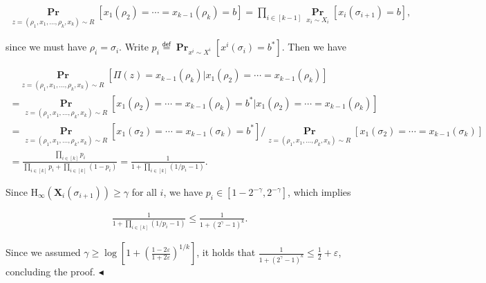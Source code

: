 \documentclass[10pt,a4paper]{article}
\begin{document}
\[\begin{gathered}
\operatorname*{\mathbf{Pr}}_{z=(\rho_{1},x_{1},\dots,\rho_{k},x_{k})\sim R}\left[x_{1}(\rho_{2})=\cdots=x_{k-1}(\rho_{k})=b\right]=\prod_{i\in[k-1]}\operatorname*{\mathbf{Pr}}_{x_{i}\sim X_{i}}\left[x_{i}(\sigma_{i+1})=b\right],
\end{gathered}\]


since we must have $\rho_{i}=\sigma_{i}$.
Write $p_{i}\stackrel{{\scriptstyle\mathsf{def}}}{{=}}\operatorname*{\mathbf{Pr}}_{x^{i}\sim X^{i}}\left[x^{i}(\sigma_{i})=b^{*}\right]$.
Then we have\par




\[\begin{gathered}
\displaystyle\quad\operatorname*{\mathbf{Pr}}_{z=(\rho_{1},x_{1},\dots,\rho_{k},x_{k})\sim R}\left[\Pi(z)=x_{k-1}(\rho_{k})|x_{1}(\rho_{2})=\cdots=x_{k-1}(\rho_{k})\right] \\
\displaystyle=\operatorname*{\mathbf{Pr}}_{z=(\rho_{1},x_{1},\dots,\rho_{k},x_{k})\sim R}\left[x_{1}(\rho_{2})=\cdots=x_{k-1}(\rho_{k})=b^{*}|x_{1}(\rho_{2})=\cdots=x_{k-1}(\rho_{k})\right] \\
\displaystyle=\operatorname*{\mathbf{Pr}}_{z=(\rho_{1},x_{1},\dots,\rho_{k},x_{k})\sim R}\left[x_{1}(\sigma_{2})=\cdots=x_{k-1}(\sigma_{k})=b^{*}\right]/\operatorname*{\mathbf{Pr}}_{z=(\rho_{1},x_{1},\dots,\rho_{k},x_{k})\sim R}\left[x_{1}(\sigma_{2})=\cdots=x_{k-1}(\sigma_{k})\right] \\
\displaystyle=\frac{\prod_{i\in[k]}p_{i}}{\prod_{i\in[k]}p_{i}+\prod_{i\in[k]}(1-p_{i})}=\frac{1}{1+\prod_{i\in[k]}(1/p_{i}-1)}.
\end{gathered}\]


Since $\text{H}_{\infty}(\bm{X}_{i}(\sigma_{i+1}))\geq\gamma$ for all $i$, we have $p_{i}\in[1-2^{-\gamma},2^{-\gamma}]$, which implies\par


\[\begin{gathered}
\frac{1}{1+\prod_{i\in[k]}(1/p_{i}-1)}\leq\frac{1}{1+(2^{\gamma}-1)^{k}}.
\end{gathered}\]


Since we assumed $\gamma\geq\log\left[1+\left(\frac{1-2\varepsilon}{1+2\varepsilon}\right)^{1/k}\right]$, it holds that $\frac{1}{1+(2^{\gamma}-1)^{k}}\leq\frac{1}{2}+\varepsilon$, concluding the proof.
$\blacktriangleleft$\par
\end{document}
